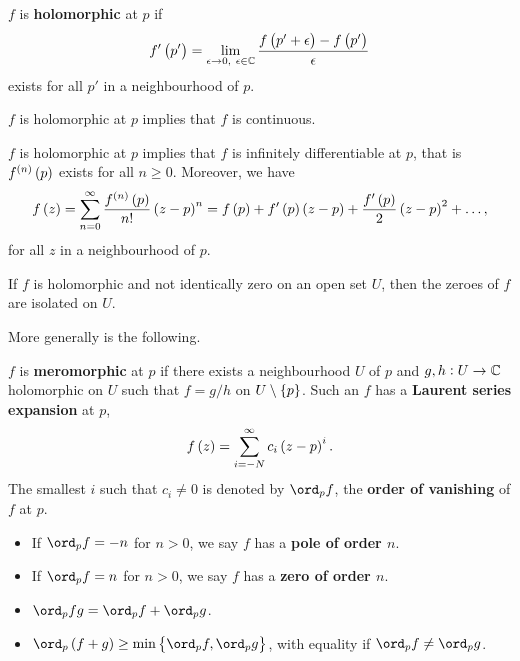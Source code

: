 \begin{definition}
$ f $ is \textbf{holomorphic} at $ p $ if
$$ f'\br{p'} = \lim_{\epsilon \to 0, \ \epsilon \in \CC} \dfrac{f\br{p' + \epsilon} - f\br{p'}}{\epsilon} $$
exists for all $ p' $ in a neighbourhood of $ p $.
\end{definition}

\begin{proposition}
$ f $ is holomorphic at $ p $ implies that $ f $ is continuous.
\end{proposition}

\begin{proposition}
$ f $ is holomorphic at $ p $ implies that $ f $ is infinitely differentiable at $ p $, that is $ f^{\br{n}}\br{p} $ exists for all $ n \ge 0 $. Moreover, we have
$$ f\br{z} = \sum_{n = 0}^\infty \dfrac{f^{\br{n}}\br{p}}{n!}\br{z - p}^n = f\br{p} + f'\br{p}\br{z - p} + \dfrac{f'\br{p}}{2}\br{z - p}^2 + \dots, $$
for all $ z $ in a neighbourhood of $ p $.
\end{proposition}

\begin{corollary}
If $ f $ is holomorphic and not identically zero on an open set $ U $, then the zeroes of $ f $ are isolated on $ U $.
\end{corollary}

More generally is the following.

\begin{definition}
$ f $ is \textbf{meromorphic} at $ p $ if there exists a neighbourhood $ U $ of $ p $ and $ g, h : U \to \mathbb{C} $ holomorphic on $ U $ such that $ f = g / h $ on $ U \setminus \cbr{p} $. Such an $ f $ has a \textbf{Laurent series expansion} at $ p $,
$$ f\br{z} = \sum_{i = -N}^\infty c_i\br{z - p}^i. $$
The smallest $ i $ such that $ c_i \ne 0 $ is denoted by $ \ord_p f $, the \textbf{order of vanishing} of $ f $ at $ p $.
\begin{itemize}
\item If $ \ord_p f = -n $ for $ n > 0 $, we say $ f $ has a \textbf{pole of order $ n $}.
\item If $ \ord_p f = n $ for $ n > 0 $, we say $ f $ has a \textbf{zero of order $ n $}.
\end{itemize}
\end{definition}

\begin{proposition}
\hfill
\begin{itemize}
\item $ \ord_p fg = \ord_p f + \ord_p g $.
\item $ \ord_p \br{f + g} \ge \min\cbr{\ord_p f, \ord_p g} $, with equality if $ \ord_p f \ne \ord_p g $.
\end{itemize}
\end{proposition}

